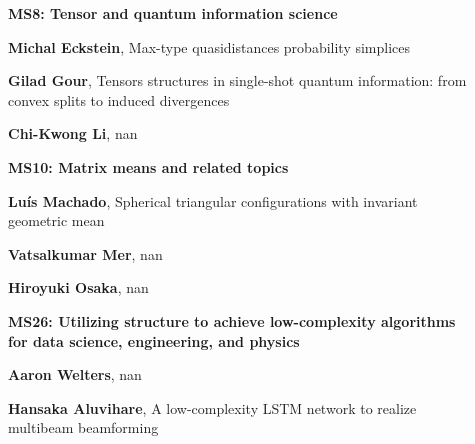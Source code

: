 \documentclass[ILAS2025-program.tex]{subfiles}
\begin{document}
\begin{description}
\begin{description}
    \item[] {\color{mstitle}\textbf{MS8: Tensor and quantum information science}} 
    \item[] \textbf{Michal Eckstein}, Max-type quasidistances probability simplices
        \item[] \textbf{Gilad Gour}, Tensors structures in single-shot quantum information: from convex splits to induced divergences
        \item[] \textbf{Chi-Kwong Li}, nan
        \end{description}
    \begin{description}
    \item[] {\color{mstitle}\textbf{MS10: Matrix means and related topics}} 
    \item[] \textbf{Luís Machado}, Spherical triangular configurations with invariant geometric mean
        \item[] \textbf{Vatsalkumar Mer}, nan
        \item[] \textbf{Hiroyuki Osaka}, nan
        \end{description}
    \begin{description}
    \item[] {\color{mstitle}\textbf{MS26: Utilizing structure to achieve low-complexity algorithms for data science, engineering, and physics}} 
    \item[] \textbf{Aaron Welters}, nan
        \item[] \textbf{Hansaka Aluvihare}, A low-complexity LSTM network to realize multibeam beamforming


\end{description}
\end{description}
\end{document}
